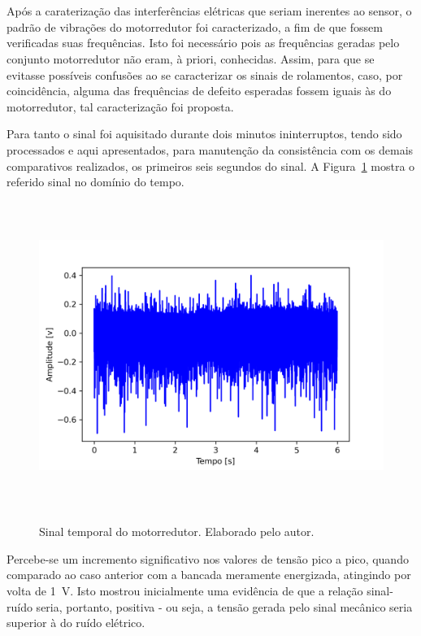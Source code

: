 \documentclass[
	12pt,				
	oneside,			
	a4paper,			
	english,			
	brazil,			
	]{abntex2ppgsi}
\begin{document}
{{{{{\section{}

Após a caraterização das interferências elétricas que seriam inerentes ao sensor, o padrão de vibrações do motorredutor foi caracterizado, a fim de que fossem verificadas suas frequências. Isto foi necessário pois as frequências geradas pelo conjunto motorredutor não eram, à priori, conhecidas. Assim, para que se evitasse possíveis confusões ao se caracterizar os sinais de rolamentos, caso, por coincidência, alguma das frequências de defeito esperadas fossem iguais às do motorredutor, tal caracterização foi proposta. 

Para tanto o sinal foi aquisitado durante dois minutos ininterruptos, tendo sido processados e aqui apresentados, para manutenção da consistência com os demais comparativos realizados, os primeiros seis segundos do sinal. A Figura~\ref{motorredutor} mostra o referido sinal no domínio do tempo.

\begin{figure}[H]
\centering
\caption {Sinal temporal do motorredutor. Elaborado pelo autor.}
\includegraphics[width=\textwidth,height=100mm,keepaspectratio]{Caso0/motorredutor}
\label{motorredutor}
\end{figure} 

Percebe-se um incremento significativo nos valores de tensão pico a pico, quando comparado ao caso anterior com a bancada meramente energizada, atingindo por volta de {\SI{1}{\volt}}. Isto mostrou inicialmente uma evidência de que a relação sinal-ruído seria, portanto, positiva - ou seja, a tensão gerada pelo sinal mecânico seria superior à do ruído elétrico. 

}}}}}
\end{document}

